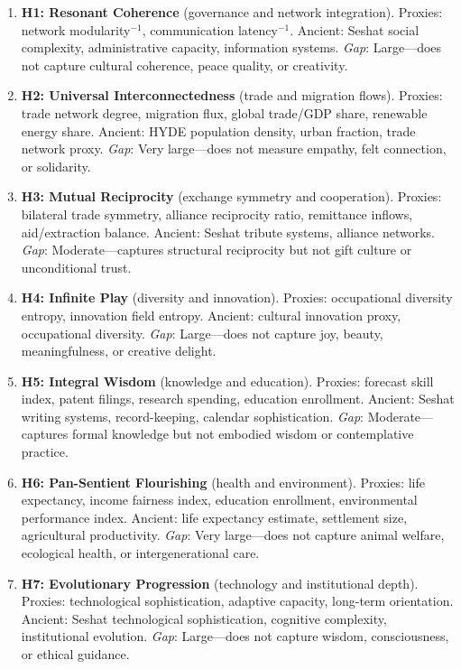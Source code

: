 \documentclass[10pt,letterpaper]{article}
\begin{document}
\begin{enumerate}
\item \textbf{H1: Resonant Coherence} (governance and network integration).
Proxies: network modularity$^{-1}$, communication latency$^{-1}$.
Ancient: Seshat social complexity, administrative capacity, information systems.
\emph{Gap}: Large---does not capture cultural coherence, peace quality, or creativity.

\item \textbf{H2: Universal Interconnectedness} (trade and migration flows).
Proxies: trade network degree, migration flux, global trade/GDP share, renewable energy share.
Ancient: HYDE population density, urban fraction, trade network proxy.
\emph{Gap}: Very large---does not measure empathy, felt connection, or solidarity.

\item \textbf{H3: Mutual Reciprocity} (exchange symmetry and cooperation).
Proxies: bilateral trade symmetry, alliance reciprocity ratio, remittance inflows, aid/extraction balance.
Ancient: Seshat tribute systems, alliance networks.
\emph{Gap}: Moderate---captures structural reciprocity but not gift culture or unconditional trust.

\item \textbf{H4: Infinite Play} (diversity and innovation).
Proxies: occupational diversity entropy, innovation field entropy.
Ancient: cultural innovation proxy, occupational diversity.
\emph{Gap}: Large---does not capture joy, beauty, meaningfulness, or creative delight.

\item \textbf{H5: Integral Wisdom} (knowledge and education).
Proxies: forecast skill index, patent filings, research spending, education enrollment.
Ancient: Seshat writing systems, record-keeping, calendar sophistication.
\emph{Gap}: Moderate---captures formal knowledge but not embodied wisdom or contemplative practice.

\item \textbf{H6: Pan-Sentient Flourishing} (health and environment).
Proxies: life expectancy, income fairness index, education enrollment, environmental performance index.
Ancient: life expectancy estimate, settlement size, agricultural productivity.
\emph{Gap}: Very large---does not capture animal welfare, ecological health, or intergenerational care.

\item \textbf{H7: Evolutionary Progression} (technology and institutional depth).
Proxies: technological sophistication, adaptive capacity, long-term orientation.
Ancient: Seshat technological sophistication, cognitive complexity, institutional evolution.
\emph{Gap}: Large---does not capture wisdom, consciousness, or ethical guidance.
\end{enumerate}
\end{document}
